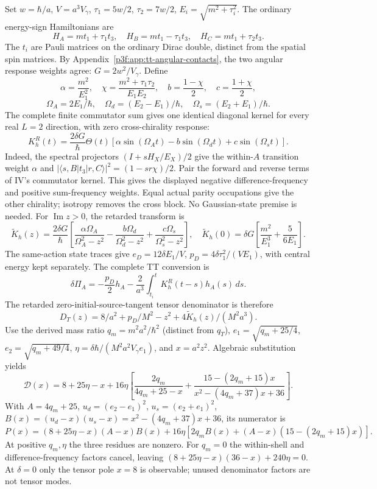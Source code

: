 \documentclass[12pt,a4paper]{article}
\begin{document}
Set $w=\hbar/a$, $V=a^3V_\gamma$, $\tau_1=5w/2$, $\tau_2=7w/2$,
$E_i=\sqrt{m^2+\tau_i^2}$. The ordinary energy-sign Hamiltonians are
\[
 H_A=mt_1+\tau_1t_3,\quad H_B=mt_1-\tau_1t_3,
 \quad H_C=mt_1+\tau_2t_3.
\]
The $t_i$ are Pauli matrices on the ordinary Dirac double, distinct from
the spatial spin matrices. By Appendix~\ref{p3f:app:tt-angular-contacts},
the two angular response weights agree: $G=2w^2/V_\gamma$.
Define
\[
 \alpha=\frac{m^2}{E_1^2},\quad
 \chi=\frac{m^2+\tau_1\tau_2}{E_1E_2},\quad
 b=\frac{1-\chi}{2},\quad c=\frac{1+\chi}{2},
\]
\[
 \Omega_A=2E_1/\hbar,\quad
 \Omega_d=(E_2-E_1)/\hbar,\quad
 \Omega_s=(E_2+E_1)/\hbar.
\]
The complete finite commutator sum gives one identical diagonal kernel
for every real $L=2$ direction, with zero cross-chirality response:
\[
 K_h^R(t)=\frac{2\delta G}{\hbar}\Theta(t)
   [\alpha\sin(\Omega_At)-b\sin(\Omega_dt)+c\sin(\Omega_st)].
\]
Indeed, the spectral projectors $(I+sH_X/E_X)/2$ give the within-$A$
transition weight $\alpha$ and
$|\langle s,B|t_3|r,C\rangle|^2=(1-sr\chi)/2$.
Pair the forward and reverse terms of IV's commutator kernel. This gives
the displayed negative difference-frequency and positive sum-frequency
weights. Equal actual parity occupations give the other chirality;
isotropy removes the cross block. No Gaussian-state premise is needed.
For $\operatorname{Im}z>0$, the retarded transform is
\[
 \widetilde K_h(z)=\frac{2\delta G}{\hbar}
  \left[\frac{\alpha\Omega_A}{\Omega_A^2-z^2}
   -\frac{b\Omega_d}{\Omega_d^2-z^2}
   +\frac{c\Omega_s}{\Omega_s^2-z^2}\right],\quad
 \widetilde K_h(0)=\delta G
          \left[\frac{m^2}{E_1^3}+\frac5{6E_1}\right].
\]
The same-action state traces give
$e_D=12\delta E_1/V$, $p_D=4\delta\tau_1^2/(VE_1)$, with central
energy kept separately. The complete TT conversion is
\[
 \delta\Pi_A=-\frac{p_D}{2}h_A
            -\frac2{a^3}\int_{t_i}^tK_h^R(t-s)h_A(s)\,ds.
\]
The retarded zero-initial-source-tangent tensor denominator is therefore
\[
 D_T(z)=8/a^2+p_D/M^2-z^2
                         +4\widetilde K_h(z)/(M^2a^3).
\]
Use the derived mass ratio $q_m=m^2a^2/\hbar^2$ (distinct from $q_T$),
$e_1=\sqrt{q_m+25/4}$, $e_2=\sqrt{q_m+49/4}$,
$\eta=\delta\hbar/(M^2a^2V_\gamma e_1)$, and $x=a^2z^2$.
Algebraic substitution yields
\begin{equation}
\label{p8:eq:stationary-tt-rational-denominator}
 \mathcal D(x)=8+25\eta-x+16\eta\left[
    \frac{2q_m}{4q_m+25-x}
    +\frac{15-(2q_m+15)x}{x^2-(4q_m+37)x+36}\right].
\end{equation}
With $A=4q_m+25$, $u_d=(e_2-e_1)^2$, $u_s=(e_2+e_1)^2$,
$B(x)=(u_d-x)(u_s-x)=x^2-(4q_m+37)x+36$, its numerator is
\[
 P(x)=(8+25\eta-x)(A-x)B(x)
        +16\eta[2q_mB(x)+(A-x)(15-(2q_m+15)x)].
\]
At positive $q_m,\eta$ the three residues are nonzero. For $q_m=0$ the
within-shell and difference-frequency factors cancel, leaving
$(8+25\eta-x)(36-x)+240\eta=0$. At $\delta=0$ only the tensor pole
$x=8$ is observable; unused denominator factors are not tensor modes.
\end{document}
